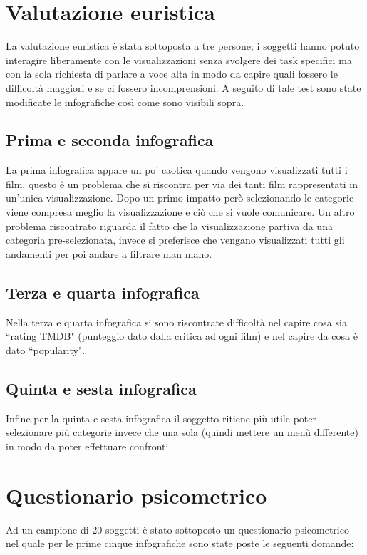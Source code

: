 \section{Valutazione euristica}
La valutazione euristica è stata sottoposta a tre persone; i soggetti hanno potuto interagire liberamente con le visualizzazioni senza svolgere dei task specifici ma con la sola richiesta di parlare a voce alta in modo da capire quali fossero le difficoltà maggiori e se ci fossero incomprensioni. A seguito di tale test sono state modificate le infografiche così come sono visibili sopra. 

\subsection{Prima e seconda infografica}
La prima infografica appare un po' caotica quando vengono visualizzati tutti i film, questo è un problema che si  riscontra per via dei tanti film rappresentati in un'unica visualizzazione. Dopo un primo impatto però selezionando le categorie viene compresa meglio la visualizzazione e ciò che si vuole comunicare. Un altro problema riscontrato riguarda il fatto che la visualizzazione partiva da una categoria pre-selezionata, invece si preferisce che vengano visualizzati tutti gli andamenti per poi andare a filtrare man mano.

\subsection{Terza e quarta infografica}
Nella terza e quarta infografica si sono riscontrate difficoltà nel capire cosa sia “rating TMDB" (punteggio dato dalla critica ad ogni film) e nel capire da cosa è dato “popularity". 

\subsection{Quinta e sesta infografica}
Infine per la quinta e sesta infografica il soggetto ritiene più utile poter selezionare più categorie invece che una sola (quindi mettere un menù differente) in modo da poter effettuare confronti. 

\section{Questionario psicometrico}

Ad un campione di 20 soggetti è stato sottoposto un questionario psicometrico nel quale per le prime cinque infografiche sono state poste le seguenti domande: 

